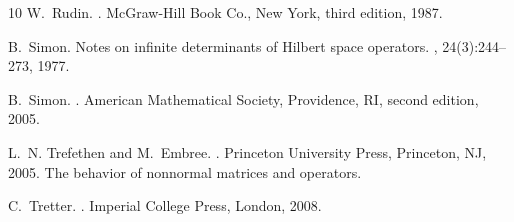 \documentclass[12pt,a4paper]{article}
\theoremstyle{definition}
\theoremstyle{remark}
\numberwithin{equation}{section}
\begin{document}
\begin{thebibliography}{10}
W.~Rudin.
.
\newblock McGraw-Hill Book Co., New York, third edition, 1987.

B.~Simon.
\newblock Notes on infinite determinants of {H}ilbert space operators.
, 24(3):244--273, 1977.

B.~Simon.
.
\newblock American Mathematical Society, Providence, RI, second edition, 2005.

L.~N. Trefethen and M.~Embree.
.
\newblock Princeton University Press, Princeton, NJ, 2005.
\newblock The behavior of nonnormal matrices and operators.

C.~Tretter.
.
\newblock Imperial College Press, London, 2008.

\end{thebibliography}

 
\end{document}
